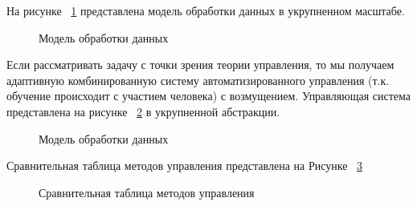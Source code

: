 На рисунке ~\cref{fig:NNproc} представлена модель обработки данных в укрупненном масштабе. 
\begin{figure}[ht]
    \caption{Модель обработки данных }\label{fig:NNproc}
\end{figure}

Если рассматривать задачу с точки зрения теории управления, то мы получаем адаптивную комбинированную систему автоматизированного управления (т.к. обучение происходит с участием человека) с возмущением. 
Управляющая система представлена на рисунке ~\cref{fig:NNsau} в укрупненной абстракции. 
\begin{figure}[ht]
    \caption{Модель обработки данных }\label{fig:NNsau}
\end{figure}

Сравнительная таблица методов управления представлена на Рисунке ~\cref{fig:Csau}
\begin{figure}[ht]
    \caption{Сравнительная таблица методов управления}\label{fig:Csau}
\end{figure}

